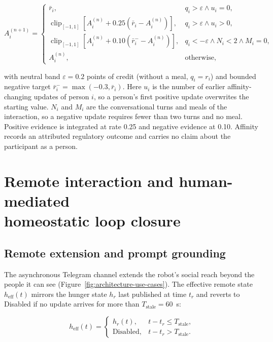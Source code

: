 \begin{equation}
    A_i^{(n+1)}=
    \begin{cases}
        \bar r_i, & q_i>\varepsilon \land u_i=0,\\
        \operatorname{clip}_{[-1,1]}\left[A_i^{(n)}+0.25\left(\bar r_i-A_i^{(n)}\right)\right], & q_i>\varepsilon \land u_i>0,\\
        \operatorname{clip}_{[-1,1]}\left[A_i^{(n)}+0.10\left(\bar r_i^{-}-A_i^{(n)}\right)\right], & q_i<-\varepsilon \land N_i<2 \land M_i=0,\\
        A_i^{(n)}, & \text{otherwise},
    \end{cases}
    \label{eq:affinity-update}
\end{equation}

with neutral band $\varepsilon=0.2$ points of credit (without a meal, $q_i=r_i$) and bounded negative target $\bar r_i^{-} = \max(-0.3, \bar r_i)$. Here $u_i$ is the number of earlier affinity-changing updates of person $i$, so a person's first positive update overwrites the starting value. $N_i$ and $M_i$ are the conversational turns and meals of the interaction, so a negative update requires fewer than two turns and no meal. Positive evidence is integrated at rate 0.25 and negative evidence at 0.10. Affinity records an attributed regulatory outcome and carries no claim about the participant as a person.

\section[Remote interaction and human-mediated homeostatic loop closure]{Remote interaction and human-mediated\\homeostatic loop closure}
\label{sec:remote-interaction}

\subsection{Remote extension and prompt grounding}
\label{subsec:remote-extension}

The asynchronous Telegram channel extends the robot's social reach beyond the people it can see (Figure~\ref{fig:architecture-use-cases}). The effective remote state $h_{\mathrm{eff}}(t)$ mirrors the hunger state $h_r$ last published at time $t_r$ and reverts to Disabled if no update arrives for more than $T_{\mathrm{stale}}=60$~s:

\begin{equation}
    h_{\mathrm{eff}}(t)=
    \begin{cases}
        h_r(t), & t-t_r\leq T_{\mathrm{stale}},\\
        \mathrm{Disabled}, & t-t_r>T_{\mathrm{stale}}.
    \end{cases}
    \label{eq:effective-remote-state}
\end{equation}

